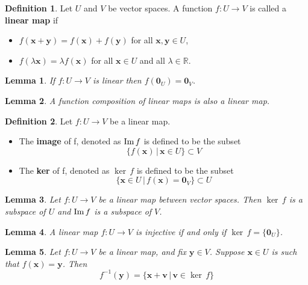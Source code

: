 \documentclass[11pt,a4paper]{article}
\newcommand\R{\mathbb{R}}
\newcommand\xb{\mathbf{x}}
\newcommand\yb{\mathbf{y}}
\newcommand\im{\textup{Im}}
\newtheorem{lemma}{Lemma}
\theoremstyle{definition}
\newtheorem{definition}{Definition}
\begin{document}
\begin{definition}
    Let $ U $ and $ V $ be vector spaces. A function $ f : U \to V $ is called a \textbf{linear map} if
    \begin{itemize}
        \item $ f(\xb + \yb) = f(\xb) + f(\yb) $ for all $ \xb, \yb \in U $,
        \item $ f(\lambda\xb) = \lambda f(\xb) $ for all $ \xb \in U $ and all $ \lambda \in \R $.
    \end{itemize}
\end{definition}

\begin{lemma}
    If $ f : U \to V $ is linear then $ f(\mathbf{0}_U) =\mathbf{0}_V $. 
\end{lemma}

\begin{lemma}
    A function composition of linear maps is also a linear map.
\end{lemma}

\begin{definition}
    Let $ f : U \to V $ be a linear map. 
    \begin{itemize}
        \item The \textbf{image} of f, denoted as $ \im \, f $ is defined to be the subset 
        \[ \{ f(\xb)\, |\,  \xb \in U \} \subset V\]
        \item The \textbf{ker} of f, denoted as $ \ker \, f $ is defined to be the subset 
        \[ \{ \xb \in U\, |\,  f(\xb) = \mathbf{0}_V \} \subset U\]
    \end{itemize}
\end{definition}

\begin{lemma}
    Let $ f : U \to V $ be a linear map between vector spaces. Then $ \ker \, f $ is a subspace of $ U $ and $ \im \, f $ is a subspace of $ V $.
\end{lemma}

\begin{lemma}
    A linear map $ f : U \to V $ is injective if and only if $ \ker \, f = \{ \mathbf{0}_U \} $.
\end{lemma}

\begin{lemma}
    Let $ f : U \to V $ be a linear map, and fix $ \yb \in V $. Suppose $ \xb \in U $ is such that $ f(\xb) = \yb $. Then
    \[ f^{-1} (\yb) = \{\xb + \mathbf{v}\,  | \, \mathbf{v} \in \ker \, f\}\]
\end{lemma}
\end{document}
